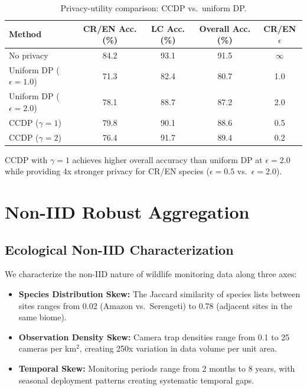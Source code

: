 \documentclass[11pt,a4paper]{article}
\begin{document}
\begin{table}[H]
\centering
\caption{Privacy-utility comparison: CCDP vs.\ uniform DP.}
\label{tab:privacy_utility}
\begin{tabular}{@{}lcccc@{}}
\toprule
\textbf{Method} & \textbf{CR/EN Acc. (\%)} & \textbf{LC Acc. (\%)} & \textbf{Overall Acc. (\%)} & \textbf{CR/EN $\epsilon$} \\
\midrule
No privacy & 84.2 & 93.1 & 91.5 & $\infty$ \\
Uniform DP ($\epsilon=1.0$) & 71.3 & 82.4 & 80.7 & 1.0 \\
Uniform DP ($\epsilon=2.0$) & 78.1 & 88.7 & 87.2 & 2.0 \\
CCDP ($\gamma=1$) & 79.8 & 90.1 & 88.6 & 0.5 \\
CCDP ($\gamma=2$) & 76.4 & 91.7 & 89.4 & 0.2 \\
\bottomrule
\end{tabular}
\end{table}

CCDP with $\gamma=1$ achieves higher overall accuracy than uniform DP at $\epsilon=2.0$ while providing 4x stronger privacy for CR/EN species ($\epsilon=0.5$ vs.\ $\epsilon=2.0$).

\section{Non-IID Robust Aggregation}
\label{sec:aggregation}

\subsection{Ecological Non-IID Characterization}

We characterize the non-IID nature of wildlife monitoring data along three axes:

\begin{itemize}[leftmargin=*]
    \item \textbf{Species Distribution Skew:} The Jaccard similarity of species lists between sites ranges from 0.02 (Amazon vs.\ Serengeti) to 0.78 (adjacent sites in the same biome).
    \item \textbf{Observation Density Skew:} Camera trap densities range from 0.1 to 25 cameras per km$^2$, creating 250x variation in data volume per unit area.
    \item \textbf{Temporal Skew:} Monitoring periods range from 2 months to 8 years, with seasonal deployment patterns creating systematic temporal gaps.
\end{itemize}
\end{document}
